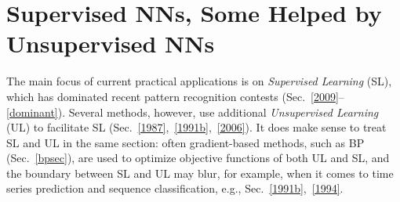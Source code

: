 \documentclass[letterpaper]{article}
\begin{document}
\begin{sloppypar}
\section{Supervised NNs, Some Helped by Unsupervised NNs}
\label{super}

The main focus of current practical applications is on {\em Supervised Learning} (SL),
which has dominated recent pattern recognition contests 
(Sec.~\ref{2009}--\ref{dominant}).
Several methods, however, use additional 
{\em Unsupervised Learning} (UL) to facilitate SL (Sec.~\ref{1987},~\ref{1991b},~\ref{2006}).
It does make sense to treat SL and UL in the same section:
often gradient-based methods, such as BP (Sec.~\ref{bpsec}),
are used to optimize objective functions of both UL and SL, 
and the boundary 
between SL and UL may blur, for example,
when it comes to time series prediction and sequence
classification, e.g., Sec.~\ref{1991b},~\ref{1994}.


\end{sloppypar}
\end{document}
